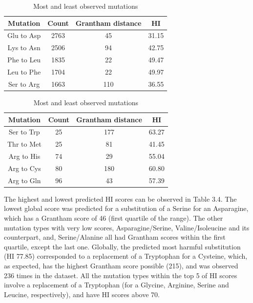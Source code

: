 \documentclass[12pt,MSc,wordcount,anon]{muthesis}
\begin{document}
\begin{flushleft}
\begin{table}
\begin{center}
\begin{tabular}{|c|c|c|c|}\hline\hline
Mutation&Count&Grantham distance&HI\\\hline
Glu to Asp&2763&45&31.15\\
Lys to Asn&2506&94&42.75\\
Phe to Leu&1835&22&49.47\\
Leu to Phe&1704&22&49.97\\
Ser to Arg&1663&110&36.55\\\hline\hline
\end{tabular}
\begin{tabular}{|c|c|c|c|}\hline\hline
Mutation&Count&Grantham distance&HI\\\hline
Ser to Trp&25&177&63.27\\
Thr to Met&25&81&41.45\\
Arg to His&74&29&55.04\\
Arg to Cys&80&180&60.80\\
Arg to Gln&96&43&57.39\\\hline\hline
\end{tabular}
\end{center}
\caption{Most and least observed mutations}\label{wombat}
\end{table}

The highest and lowest predicted HI scores can be observed in Table 3.4. The lowest global score was predicted for a substitution of a Serine for an Asparagine, which has a Grantham score of 46 (first quartile of the range). The other mutation types with very low scores, Asparagine/Serine, Valine/Isoleucine and its counterpart, and, Serine/Alanine all had Grantham scores within the first quartile, except the last one. Globally, the predicted most harmful substitution (HI 77.85) corresponded to a replacement of a Tryptophan for a Cysteine, which, as expected, has the highest Grantham score possible (215), and was observed 236 times in the dataset. All the mutation types within the top 5 of HI scores involve a replacement of a Tryptophan (for a Glycine, Arginine, Serine and Leucine, respectively), and have HI scores above 70.


\end{flushleft}
\end{document}
